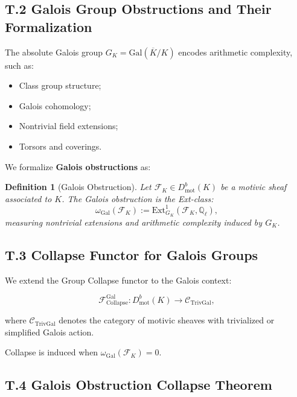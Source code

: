 \documentclass[11pt]{article}
\newtheorem{definition}[theorem]{Definition}
\begin{document}
\subsection*{T.2 Galois Group Obstructions and Their Formalization}

The absolute Galois group $G_K = \mathrm{Gal}(\overline{K}/K)$ encodes arithmetic complexity, such as:

\begin{itemize}
    \item Class group structure;
    \item Galois cohomology;
    \item Nontrivial field extensions;
    \item Torsors and coverings.
\end{itemize}

We formalize \textbf{Galois obstructions} as:

\begin{definition}[Galois Obstruction]
Let $\mathcal{F}_K \in D^b_{\mathrm{mot}}(K)$ be a motivic sheaf associated to $K$. The Galois obstruction is the Ext-class:
\[
\omega_{\mathrm{Gal}}(\mathcal{F}_K) := \mathrm{Ext}^1_{G_K}(\mathcal{F}_K, \mathbb{Q}_\ell),
\]
measuring nontrivial extensions and arithmetic complexity induced by $G_K$.
\end{definition}

\subsection*{T.3 Collapse Functor for Galois Groups}

We extend the Group Collapse functor to the Galois context:

\[
\mathcal{F}_{\mathrm{Collapse}}^{\mathrm{Gal}} : D^b_{\mathrm{mot}}(K) \longrightarrow \mathcal{C}_{\mathrm{TrivGal}},
\]

where $\mathcal{C}_{\mathrm{TrivGal}}$ denotes the category of motivic sheaves with trivialized or simplified Galois action.

Collapse is induced when $\omega_{\mathrm{Gal}}(\mathcal{F}_K) = 0$.

\subsection*{T.4 Galois Obstruction Collapse Theorem}
\end{document}
